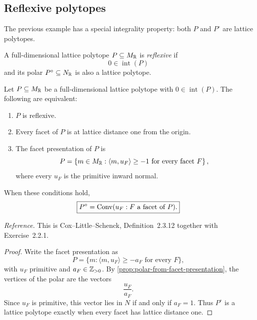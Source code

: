 \subsection{Reflexive polytopes}

The previous example has a special integrality property: both \(P\)
and \(P^\circ\) are lattice polytopes.

\begin{definition}
\label{def:reflexive-polytope}
A full-dimensional lattice polytope \(P\subseteq M_{\mathbb{R}}\) is
\emph{reflexive} if
\[
0\in\operatorname{int}(P)
\]
and its polar \(P^\circ\subseteq N_{\mathbb{R}}\) is also a lattice polytope.
\end{definition}

\begin{theorem}
\label{thm:reflexive-distance-one-criterion}
Let \(P\subseteq M_{\mathbb{R}}\) be a full-dimensional lattice polytope with
\(0\in\operatorname{int}(P)\). The following are equivalent:

\begin{enumerate}[label=(\alph*),wide=0pt]
\item \(P\) is reflexive.

\item Every facet of \(P\) is at lattice distance one from the origin.

\item The facet presentation of \(P\) is
\[
P=
\left\{
 m\in M_{\mathbb{R}}:
 \langle m,u_F\rangle\geq-1
 \text{ for every facet }F
\right\},
\]
where every \(u_F\) is the primitive inward normal.
\end{enumerate}

When these conditions hold,
\[
\boxed{
P^\circ
=
\operatorname{Conv}(u_F:F\text{ a facet of }P).
}
\]
\end{theorem}

\noindent
\textit{Reference.}
This is Cox--Little--Schenck, Definition~2.3.12 together with
Exercise~2.2.1.

\begin{proof}
Write the facet presentation as
\[
P=
\{m:\langle m,u_F\rangle\geq-a_F\text{ for every }F\},
\]
with \(u_F\) primitive and \(a_F\in\mathbb{Z}_{>0}\). By
\cref{prop:polar-from-facet-presentation}, the vertices of the polar
are the vectors
\[
\frac{u_F}{a_F}.
\]
Since \(u_F\) is primitive, this vector lies in \(N\) if and only if
\(a_F=1\). Thus \(P^\circ\) is a lattice polytope exactly when every
facet has lattice distance one.
\end{proof}

